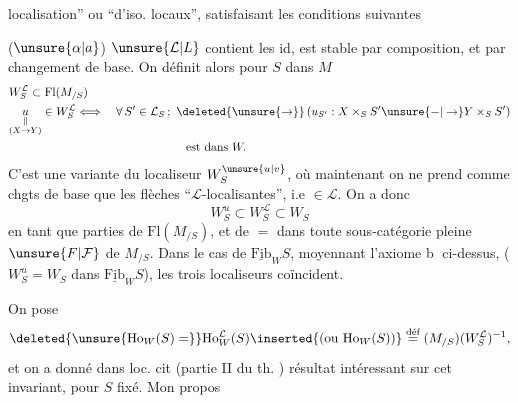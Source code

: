localisation'' ou ``d'iso. locaux'', satisfaisant les conditions suivantes

($\unsure{\alpha|a}$) $\unsure{\mathcal L|L}$ contient les id, est stable par composition, et par changement de base.
On définit alors pour  $S$ dans $M$
\[
\begin{aligned}
&W_S^{\mathcal L}\subset\mathrm{Fl}(M_{/S})\\
&\underset{\substack{\Vert\\(X\to Y)}}{u}\in W_S^{\mathcal L}
\Longleftrightarrow\quad\forall\, S'\in\mathcal L_S\,;\ \deleted{\unsure{\to}}\,
(u_{S'}:X\mathbin{\times_S} S'\unsure{-|\to}Y\mathbin{\times_S}S')\\
&\hspace{15em}\text{est dans }W.
\end{aligned}
\]
C'est  une variante du localiseur $W_S^{\unsure{u|v}}$, où maintenant on ne prend comme chgts de base que les flèches  ``$\mathcal L$-localisantes'', i.e $\in\mathcal L$. On a donc
\[
W_S^u\subset W_S^{\mathcal L}\subset W_S
\]
en tant que parties de $\mathrm{Fl}(M_{/S})$, et de $=$ dans toute sous-catégorie pleine $\unsure{F|\mathcal F}$ de $M_{/S}$. Dans le cas de $\underline{\mathrm{Fib}}_W S$, moyennant l'axiome \textcircled{b} ci-dessus, ($W_S^u=W_S$ dans $\underline{\mathrm{Fib}}_W S$), les trois localiseurs coïncident.

On pose
\[
\deleted{\unsure{\mathrm{Ho}_W(S)=}}\mathrm{Ho}^{\mathcal L}_W(S)
\inserted{(\text{ou }\mathrm{Ho}_{W}(S))}
\overset{\text{déf}}{=}(M_{/S})(W_S^{\mathcal L})^{-1},
\]
et on a donné dans loc. cit (partie II du th. )   résultat intéressant sur cet invariant, pour $S$ fixé. Mon propos
